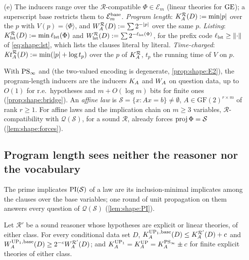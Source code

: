 \begin{definition}
(e) The inducers range over the $\mathcal R$-compatible $\Phi\in\mathcal E_m$ (linear theories for $\mathrm{GE}$); a superscript $\mathrm{base}$ restricts them to $\mathcal E^{\rm base}_m$. \emph{Program length}: $K_{A}^{\mathcal R}(D):=\min\lvert p\rvert$ over the $p$ with $V(p)=\langle\Phi\rangle$, and $W_{A}^{\mathcal R}(D):=\sum2^{-\lvert p\rvert}$ over the same $p$. \emph{Listing}: $K_{\mathrm{lst}}^{\mathcal R}(D):=\min\ell_{\rm lst}(\Phi)$ and $W_{\mathrm{lst}}^{\mathcal R}(D):=\sum2^{-\ell_{\rm lst}(\Phi)}$, for the prefix code $\ell_{\rm lst}\ge\lVert\cdot\rVert$ of \cref{eq:shape:lst}, which lists the clauses literal by literal. \emph{Time-charged}: $\mathit{Kt}_{A}^{\mathcal R}(D):=\min(\lvert p\rvert+\log t_p)$ over the $p$ of $K_{A}^{\mathcal R}$, $t_p$ the running time of $V$ on $p$.
\end{definition}

With $\mathrm{PS}_\infty$ and \Ethree{} (the two-valued encoding is degenerate, \cref{prop:shape:E2}), the program-length inducers are the \SAIabbr inducers $K_{A}$ and $W_{A}$ on question data, up to $O(1)$ for r.e.\ hypotheses and $m+O(\log m)$ bits for finite ones (\cref{prop:shape:bridge}). An \emph{affine law} is $\mathcal S=\{x:Ax=b\}\ne\emptyset$, $A\in\mathrm{GF}(2)^{r\times m}$ of rank $r\ge1$. For affine laws and the implication chain on $m\ge3$ variables, $\mathcal R$-compatibility with $\mathcal Q(\mathcal S)$, for a sound $\mathcal R$, already forces $\operatorname{proj}\Phi=\mathcal S$ (\cref{lem:shape:forces}).

\subsection{Program length sees neither the reasoner nor the vocabulary}\label{sec:shape:invisible}

The prime implicates $\mathrm{PI}(\mathcal S)$ of a law are its inclusion-minimal implicates among the clauses over the base variables; one round of unit propagation on them answers every question of $\mathcal Q(\mathcal S)$ (\cref{lem:shape:PI}).

\begin{theorem}\label{thm:shape:invisible}
Let $\mathcal R'$ be a sound reasoner whose hypotheses are explicit or linear theories, of either class. For every conditional data set $D$, $K_{A}^{\mathrm{UP}_1,\mathrm{base}}(D)\le K_{A}^{\mathcal R'}(D)+c$ and $W_{A}^{\mathrm{UP}_1,\mathrm{base}}(D)\ge2^{-c}W_{A}^{\mathcal R'}(D)$; and $K_{A}^{\mathrm{UP}_1}=K_{A}^{\mathrm{UP}}=K_{A}^{\mathrm{PS}_\infty}\pm c$ for finite explicit theories of either class.
\end{theorem}

